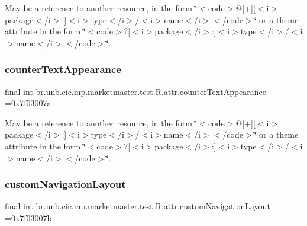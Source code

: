 May be a reference to another resource, in the form \char`\"{}$<$code$>$@\mbox{[}+\mbox{]}\mbox{[}$<$i$>$package$<$/i$>$\+:\mbox{]}$<$i$>$type$<$/i$>$/$<$i$>$name$<$/i$>$$<$/code$>$\char`\"{} or a theme attribute in the form \char`\"{}$<$code$>$?\mbox{[}$<$i$>$package$<$/i$>$\+:\mbox{]}$<$i$>$type$<$/i$>$/$<$i$>$name$<$/i$>$$<$/code$>$\char`\"{}. \mbox{\label{classbr_1_1unb_1_1cic_1_1mp_1_1marketmaster_1_1test_1_1R_1_1attr_a3251bbe20e46163c9da7f06366c0509d}} 
\subsubsection{\texorpdfstring{counter\+Text\+Appearance}{counterTextAppearance}}
{\footnotesize\ttfamily final int br.\+unb.\+cic.\+mp.\+marketmaster.\+test.\+R.\+attr.\+counter\+Text\+Appearance =0x7f03007a\hspace{0.3cm}{\ttfamily [static]}}

May be a reference to another resource, in the form \char`\"{}$<$code$>$@\mbox{[}+\mbox{]}\mbox{[}$<$i$>$package$<$/i$>$\+:\mbox{]}$<$i$>$type$<$/i$>$/$<$i$>$name$<$/i$>$$<$/code$>$\char`\"{} or a theme attribute in the form \char`\"{}$<$code$>$?\mbox{[}$<$i$>$package$<$/i$>$\+:\mbox{]}$<$i$>$type$<$/i$>$/$<$i$>$name$<$/i$>$$<$/code$>$\char`\"{}. \mbox{\label{classbr_1_1unb_1_1cic_1_1mp_1_1marketmaster_1_1test_1_1R_1_1attr_a069b8b5bacae19d27d16fb087fcedaac}} 
\subsubsection{\texorpdfstring{custom\+Navigation\+Layout}{customNavigationLayout}}
{\footnotesize\ttfamily final int br.\+unb.\+cic.\+mp.\+marketmaster.\+test.\+R.\+attr.\+custom\+Navigation\+Layout =0x7f03007b\hspace{0.3cm}{\ttfamily [static]}}

